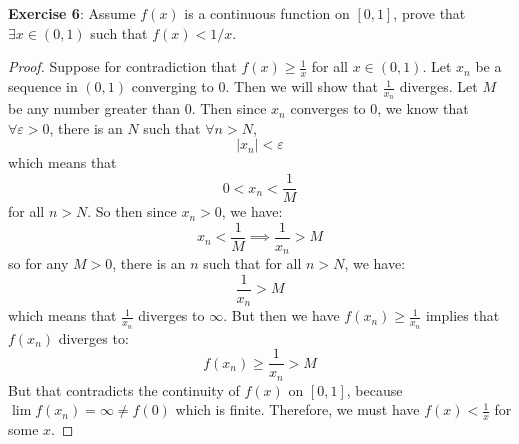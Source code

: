 \documentclass{article}
\begin{document}
\textbf{Exercise 6}: Assume $f(x)$ is a continuous function on $[0, 1]$, prove that $\exists x \in (0, 1)$ such that $f(x) < 1/x$.
    \begin{proof}
        Suppose for contradiction that $f(x) \geq \frac{1}{x}$ for all $x \in (0, 1)$. Let $x_{n}$ be a sequence in $(0, 1)$ converging to $0$. Then we will show that $\frac{1}{x_{n}}$ diverges. Let $M$ be any number greater than $0$. Then since $x_{n}$ converges to $0$, we know that $\forall \varepsilon > 0$, there is an $N$ such that $\forall n > N$, 
            \begin{equation*}
                \lvert x_{n} \rvert < \varepsilon
            \end{equation*}
        which means that
            \begin{equation*}
                0 < x_{n} < \dfrac{1}{M}
            \end{equation*}
        for all $n > N$. So then since $x_{n} > 0$, we have:
            \begin{equation*}
                x_{n} < \dfrac{1}{M} \implies \dfrac{1}{x_{n}} > M
            \end{equation*}
        so for any $M > 0$, there is an $n$ such that for all $n > N$, we have:
            \begin{equation*}
                \dfrac{1}{x_{n}} > M
            \end{equation*}
        which means that $\frac{1}{x_{n}}$ diverges to $\infty $. But then we have $f(x_{n}) \geq \frac{1}{x_{n}}$ implies that $f(x_{n})$ diverges to:
            \begin{equation*}
                f(x_{n}) \geq \dfrac{1}{x_{n}} > M
            \end{equation*}
        But that contradicts the continuity of $f(x)$ on $[0, 1]$, because $\lim f(x_{n}) = \infty \neq f(0)$ which is finite. Therefore, we must have $f(x) < \frac{1}{x}$ for some $x$.
    \end{proof}
\end{document}
